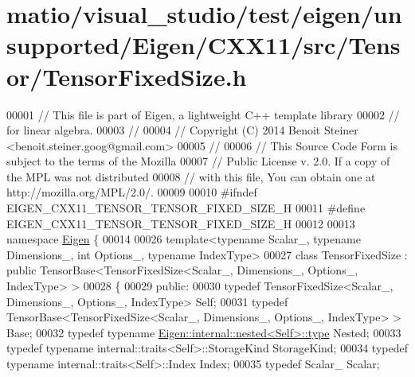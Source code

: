 \hypertarget{matio_2visual__studio_2test_2eigen_2unsupported_2_eigen_2_c_x_x11_2src_2_tensor_2_tensor_fixed_size_8h_source}{}\section{matio/visual\+\_\+studio/test/eigen/unsupported/\+Eigen/\+C\+X\+X11/src/\+Tensor/\+Tensor\+Fixed\+Size.h}
\label{matio_2visual__studio_2test_2eigen_2unsupported_2_eigen_2_c_x_x11_2src_2_tensor_2_tensor_fixed_size_8h_source}

\begin{DoxyCode}
00001 \textcolor{comment}{// This file is part of Eigen, a lightweight C++ template library}
00002 \textcolor{comment}{// for linear algebra.}
00003 \textcolor{comment}{//}
00004 \textcolor{comment}{// Copyright (C) 2014 Benoit Steiner <benoit.steiner.goog@gmail.com>}
00005 \textcolor{comment}{//}
00006 \textcolor{comment}{// This Source Code Form is subject to the terms of the Mozilla}
00007 \textcolor{comment}{// Public License v. 2.0. If a copy of the MPL was not distributed}
00008 \textcolor{comment}{// with this file, You can obtain one at http://mozilla.org/MPL/2.0/.}
00009 
00010 \textcolor{preprocessor}{#ifndef EIGEN\_CXX11\_TENSOR\_TENSOR\_FIXED\_SIZE\_H}
00011 \textcolor{preprocessor}{#define EIGEN\_CXX11\_TENSOR\_TENSOR\_FIXED\_SIZE\_H}
00012 
00013 \textcolor{keyword}{namespace }\hyperlink{namespace_eigen}{Eigen} \{
00014 
00026 \textcolor{keyword}{template}<\textcolor{keyword}{typename} Scalar\_, \textcolor{keyword}{typename} Dimensions\_, \textcolor{keywordtype}{int} Options\_, \textcolor{keyword}{typename} IndexType>
00027 \textcolor{keyword}{class }TensorFixedSize : \textcolor{keyword}{public} TensorBase<TensorFixedSize<Scalar\_, Dimensions\_, Options\_, IndexType> >
00028 \{
00029   \textcolor{keyword}{public}:
00030     \textcolor{keyword}{typedef} TensorFixedSize<Scalar\_, Dimensions\_, Options\_, IndexType> Self;
00031     \textcolor{keyword}{typedef} TensorBase<TensorFixedSize<Scalar\_, Dimensions\_, Options\_, IndexType> > Base;
00032     \textcolor{keyword}{typedef} \textcolor{keyword}{typename} \hyperlink{class_eigen_1_1internal_1_1_tensor_lazy_evaluator_writable}{Eigen::internal::nested<Self>::type} Nested;
00033     \textcolor{keyword}{typedef} \textcolor{keyword}{typename} internal::traits<Self>::StorageKind StorageKind;
00034     \textcolor{keyword}{typedef} \textcolor{keyword}{typename} internal::traits<Self>::Index Index;
00035     \textcolor{keyword}{typedef} Scalar\_ Scalar;

\end{DoxyCode}
